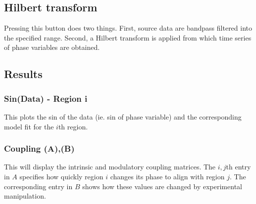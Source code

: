 \subsection{Hilbert transform}
Pressing this button does two things. First, source data are bandpass filtered into the specified range. Second, a Hilbert transform is applied from which time series of phase variables are obtained. 

\subsection{Results}

\subsubsection{Sin(Data) - Region i}
This plots the sin of the data (ie. sin of phase variable) and the corresponding model fit for the $i$th region.

\subsubsection{Coupling (A),(B)}
This will display the intrinsic and modulatory coupling matrices. The $i,j$th entry in $A$ specifies how quickly region $i$ changes its phase to align with region $j$. The corresponding entry in $B$ shows how these values are changed by experimental manipulation. 
